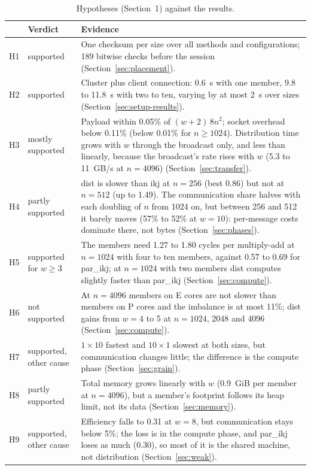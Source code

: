 \documentclass[11pt,a4paper]{article}
\begin{document}
\begin{table}[htbp]
\centering\small
\caption{Hypotheses (Section~1) against the results.}
\label{tab:hyp}
\begin{tabular}{>{\raggedright}p{0.6cm}>{\raggedright}p{2.2cm}>{\raggedright\arraybackslash}p{11.6cm}}
\toprule
& Verdict & Evidence \\
\midrule
H1 & supported & One checksum per size over all methods and configurations; 189 bitwise checks before the session (Section~\ref{sec:placement}). \\
H2 & supported & Cluster plus client connection: 0.6~s with one member, 9.8 to 11.8~s with two to ten, varying by at most 2~s over sizes (Section~\ref{sec:setup-results}). \\
H3 & mostly supported & Payload within 0.05\% of $(w+2)\,8n^2$; socket overhead below 0.11\% (below 0.01\% for $n\ge1024$). Distribution time grows with $w$ through the broadcast only, and less than linearly, because the broadcast's rate rises with $w$ (5.3 to 11~GB/s at $n=4096$) (Section~\ref{sec:transfer}). \\
H4 & partly supported & dist is slower than ikj at $n=256$ (best 0.86) but not at $n=512$ (up to 1.49). The communication share halves with each doubling of $n$ from 1024 on, but between 256 and 512 it barely moves (57\% to 52\% at $w=10$): per-message costs dominate there, not bytes (Section~\ref{sec:phases}). \\
H5 & supported for $w\ge3$ & The members need 1.27 to 1.80 cycles per multiply-add at $n=1024$ with four to ten members, against 0.57 to 0.69 for par\_ikj; at $n=1024$ with two members dist computes slightly faster than par\_ikj (Section~\ref{sec:compute}). \\
H6 & not supported & At $n=4096$ members on E cores are not slower than members on P cores and the imbalance is at most 11\%; dist gains from $w=4$ to 5 at $n=1024$, 2048 and 4096 (Section~\ref{sec:compute}). \\
H7 & supported, other cause & $1\times10$ fastest and $10\times1$ slowest at both sizes, but communication changes little; the difference is the compute phase (Section~\ref{sec:grain}). \\
H8 & partly supported & Total memory grows linearly with $w$ (0.9~GiB per member at $n=4096$), but a member's footprint follows its heap limit, not its data (Section~\ref{sec:memory}). \\
H9 & supported, other cause & Efficiency falls to 0.31 at $w=8$, but communication stays below 5\%; the loss is in the compute phase, and par\_ikj loses as much (0.30), so most of it is the shared machine, not distribution (Section~\ref{sec:weak}). \\
\bottomrule
\end{tabular}
\end{table}
\end{document}
